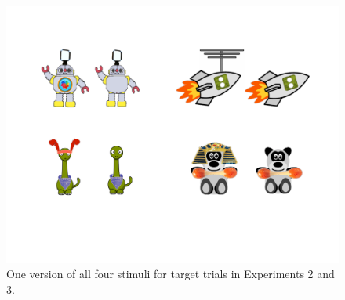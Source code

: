 \documentclass[review]{elsarticle}
\begin{document}
\begin{figure}
\begin{center}
\includegraphics[width=4.5in]{info_stims.pdf}
\caption{\label{fig:all_stims} One version of all four stimuli for target trials in Experiments 2 and 3.}
\end{center}
\end{figure}
\end{document}
